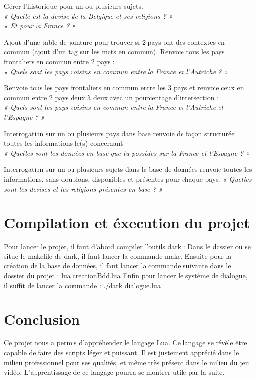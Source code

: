 \documentclass[11pt,a4paper]{article}
\begin{document}
Gérer l’historique pour un ou plusieurs sujets. \\
\textit{« Quelle est la devise de la Belgique et ses religions ? » \\
	« Et pour la France ? »}

Ajout d’une table de jointure pour trouver si 2 pays ont des contextes en commun (ajout d’un tag sur les mots en commun). Renvoie tous les pays frontaliers en commun entre 2 pays : \\
\textit{« Quels sont les pays voisins en commun entre la France et l’Autriche ? »}

Renvoie tous les pays frontaliers en commun entre les 3 pays et renvoie ceux en commun entre 2 pays deux à deux avec un pourcentage d’intersection : \\
\textit{« Quels sont les pays voisins en commun entre la France et l’Autriche et l’Espagne ? »}

Interrogation sur un ou plusieurs pays dans base renvoie de façon structurée toutes les informations le(s) concernant \\
\textit{« Quelles sont les données en base que tu possèdes sur la France et l’Espagne ? »}

Interrogation sur un ou plusieurs sujets dans la base de données renvoie toutes les informations, sans doublons, disponibles et présentes pour chaque pays.
\textit{« Quelles sont les devises et les religions présentes en base ? »}


\section{Compilation et éxecution du projet}
Pour lancer le projet, il faut d'abord compiler l'outils dark :
Dans le dossier ou se situe le makefile de dark, il faut lancer la commande make.
Ensuite pour la création de la base de données, il faut lancer la commande suivante dans le dossier du projet :
lua creationBdd.lua
Enfin pour lancer le système de dialogue, il suffit de lancer la commande :
./dark dialogue.lua

\section{Conclusion}

Ce projet nous a permis d'appréhender le langage Lua. Ce langage se révèle être capable de faire des scripts léger et puissant. Il est justement apprécié dans le milieu professionnel pour ses qualités, et même très présent dans le milieu du jeu vidéo. L'apprentissage de ce langage pourra se montrer utile par la suite.
\end{document}
